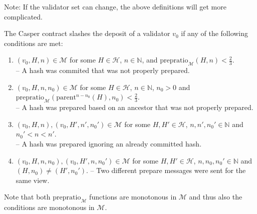 \documentclass[11pt,letterpaper]{article}
\newcommand{\uint}{\mathbb{N}}
\newcommand{\messages}{\mathcal{M}}
\begin{document}
Note: If the validator set can change, the above definitions will get more
complicated.

The Casper contract slashes the deposit of a validator $v_0$ if any of the following conditions
are met:

\begin{enumerate}
\item $(v_0, H, n) \in \messages$ for some $H \in \mathcal{H}$, $n \in \uint$,
and $\mathrm{prepratio}_\messages(H, n) < \frac{2}{3}$.\\
-- A hash was commited that was not properly prepared.
\item $(v_0, H, n, n_0) \in \messages$ for some $H \in \mathcal{H}$, $n \in \uint$,
$n_0 > 0$ and $\mathrm{prepratio}_\messages(\mathrm{parent}^{n-n_0}(H), n_0) < \frac{2}{3}$.\\
-- A hash was prepared based on an ancestor that was not properly prepared.
\item $(v_0, H, n), (v_0, H', n', n_0') \in \messages$ for some $H,H' \in \mathcal{H}$, $n, n', n_0' \in \uint$
and $n_0' < n < n'$.\\
-- A hash was prepared ignoring an already committed hash.
\item $(v_0, H, n, n_0), (v_0, H', n, n_0') \in \messages$ for some $H, H' \in \mathcal{H}$,
$n, n_0, n_0' \in \uint$ and $(H, n_0) \neq (H', n_0')$.
-- Two different prepare messages were sent for the same view.
\end{enumerate}

Note that both $\mathrm{prepratio}_\messages$ functions are monotonous in $\messages$
and thus also the conditions are monotonous in $\messages$.
\end{document}
